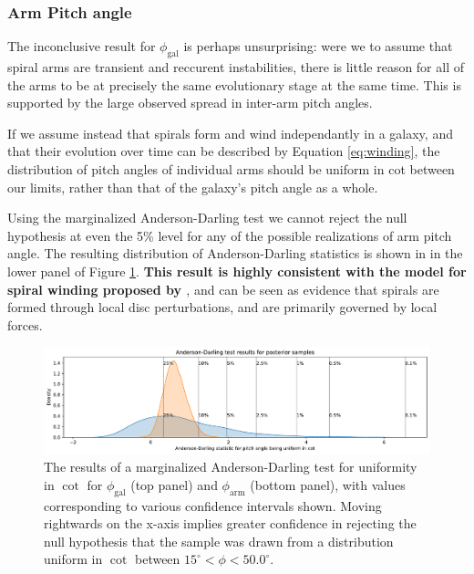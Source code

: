 \subsubsection{Arm Pitch angle}
The inconclusive result for $\phi_\mathrm{gal}$ is perhaps unsurprising: were we to assume that spiral arms are transient and reccurent instabilities, there is little reason for all of the arms to be at precisely the same evolutionary stage at the same time. This is supported by the large observed spread in inter-arm pitch angles.

If we assume instead that spirals form and wind independantly in a galaxy, and that their evolution over time can be described by Equation \ref{eq:winding}, the distribution of pitch angles of individual arms should be uniform in cot between our limits, rather than that of the galaxy's pitch angle as a whole.

Using the marginalized Anderson-Darling test we cannot reject the null hypothesis at even the 5\% level for any of the possible realizations of arm pitch angle. The resulting distribution of Anderson-Darling statistics is shown in in the lower panel of Figure \ref{fig:ad-cot-test}. \textbf{This result is highly consistent with the model for spiral winding proposed by \citet{2019arXiv190910291P}}, and can be seen as evidence that spirals are formed through local disc perturbations, and are primarily governed by local forces.

\begin{figure}
  \includegraphics[width=17.7cm]{plots/combined_cot_uniform_marginalized_tests.pdf}
  \caption{The results of a marginalized Anderson-Darling test for uniformity in $\cot$ for $\phi_\mathrm{gal}$ (top panel) and $\phi_\mathrm{arm}$ (bottom panel), with values corresponding to various confidence intervals shown. Moving rightwards on the x-axis implies greater confidence in rejecting the null hypothesis that the sample was drawn from a distribution uniform in $\cot$ between $15^\circ < \phi < 50.0^\circ$.}
  \label{fig:ad-cot-test}
\end{figure}
